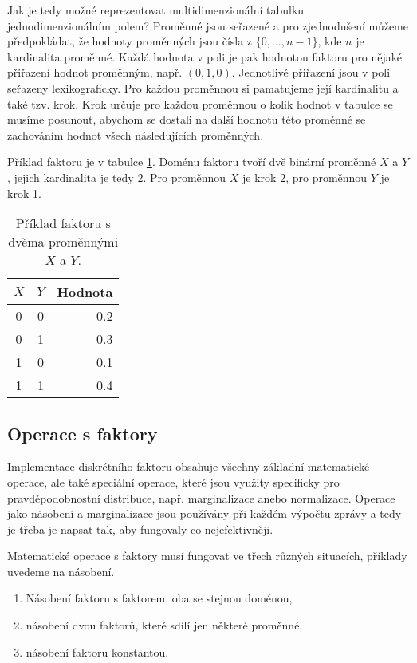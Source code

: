 Jak je tedy možné reprezentovat multidimenzionální tabulku jednodimenzionálním polem?
Proměnné jsou seřazené a pro zjednodušení můžeme předpokládat, že hodnoty proměnných jsou čísla z $\{0, \dots, n-1\}$, kde $n$ je kardinalita proměnné.
Každá hodnota v poli je pak hodnotou faktoru pro nějaké přiřazení hodnot proměnným, např. $(0, 1, 0)$.
Jednotlivé přiřazení jsou v poli seřazeny lexikograficky.
Pro každou proměnnou si pamatujeme její kardinalitu a také tzv. krok.
Krok určuje pro každou proměnnou o kolik hodnot v tabulce se musíme posunout, abychom se dostali na další hodnotu této proměnné se zachováním hodnot všech následujících proměnných.

Příklad faktoru je v tabulce \ref{tab:stride}.
Doménu faktoru tvoří dvě binární proměnné $X$ a $Y$, jejich kardinalita je tedy 2.
Pro proměnnou $X$ je krok 2, pro proměnnou $Y$ je krok 1.

\begin{table}
\begin{center}
\begin{tabular}{|c|c|r|}
\hline
$X$ & $Y$ & Hodnota \\
\hline
\hline
0 & 0 & 0.2 \\
\hline
0 & 1 & 0.3 \\
\hline
1 & 0 & 0.1 \\
\hline
1 & 1 & 0.4 \\
\hline
\end{tabular}
\end{center}
\caption{Příklad faktoru s dvěma proměnnými $X$ a $Y$.}
\label{tab:stride}
\end{table}

\subsection{Operace s faktory}

Implementace diskrétního faktoru obsahuje všechny základní matematické operace, ale také speciální operace, které jsou využity specificky pro pravděpodobnostní distribuce, např. marginalizace anebo normalizace.
Operace jako násobení a marginalizace jsou používány při každém výpočtu zprávy a tedy je třeba je napsat tak, aby fungovaly co nejefektivněji.

Matematické operace s faktory musí fungovat ve třech různých situacích, příklady uvedeme na násobení.
\begin{enumerate}
    \item Násobení faktoru s faktorem, oba se stejnou doménou,
    \item násobení dvou faktorů, které sdílí jen některé proměnné,
    \item násobení faktoru konstantou.
\end{enumerate}

